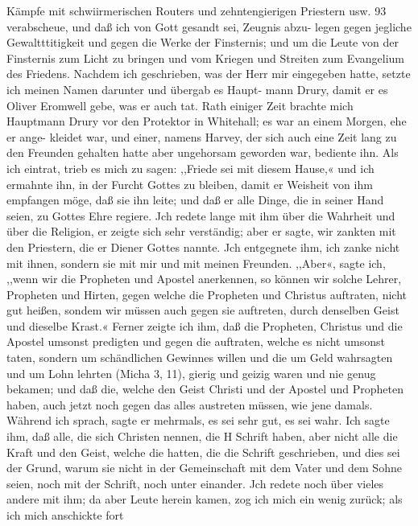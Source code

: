 Kämpfe mit schwiirmerischen Routers und zehntengierigen Priestern usw. 93
verabscheue, und daß ich von Gott gesandt sei, Zeugnis abzu-
legen gegen jegliche Gewaltttitigkeit und gegen die Werke der
Finsternis; und um die Leute von der Finsternis zum Licht zu
bringen und vom Kriegen und Streiten zum Evangelium des
Friedens. Nachdem ich geschrieben, was der Herr mir eingegeben
hatte, setzte ich meinen Namen darunter und übergab es Haupt-
mann Drury, damit er es Oliver Eromwell gebe, was er auch
tat. Rath einiger Zeit brachte mich Hauptmann Drury vor den
Protektor in Whitehall; es war an einem Morgen, ehe er ange-
kleidet war, und einer, namens Harvey, der sich auch eine Zeit
lang zu den Freunden gehalten hatte aber ungehorsam geworden
war, bediente ihn. Als ich eintrat, trieb es mich zu sagen:
,,Friede sei mit diesem Hause,« und ich ermahnte ihn, in der Furcht
Gottes zu bleiben, damit er Weisheit von ihm empfangen möge,
daß sie ihn leite; und daß er alle Dinge, die in seiner Hand
seien, zu Gottes Ehre regiere. Jch redete lange mit ihm über
die Wahrheit und über die Religion, er zeigte sich sehr verständig;
aber er sagte, wir zankten mit den Priestern, die er Diener Gottes
nannte. Jch entgegnete ihm, ich zanke nicht mit ihnen, sondern
sie mit mir und mit meinen Freunden. ,,Aber«, sagte ich, ,,wenn
wir die Propheten und Apostel anerkennen, so können wir solche
Lehrer, Propheten und Hirten, gegen welche die Propheten und
Christus auftraten, nicht gut heißen, sondem wir müssen auch
gegen sie auftreten, durch denselben Geist und dieselbe Krast.«
Ferner zeigte ich ihm, daß die Propheten, Christus und die
Apostel umsonst predigten und gegen die auftraten, welche es
nicht umsonst taten, sondern um schändlichen Gewinnes willen
und die um Geld wahrsagten und um Lohn lehrten (Micha 3, 11),
gierig und geizig waren und nie genug bekamen; und daß die,
welche den Geist Christi und der Apostel und Propheten haben,
auch jetzt noch gegen das alles austreten müssen, wie jene damals.
Während ich sprach, sagte er mehrmals, es sei sehr gut, es sei
wahr. Ich sagte ihm, daß alle, die sich Christen nennen, die
H Schrift haben, aber nicht alle die Kraft und den Geist, welche
die hatten, die die Schrift geschrieben, und dies sei der Grund,
warum sie nicht in der Gemeinschaft mit dem Vater und dem
Sohne seien, noch mit der Schrift, noch unter einander. Jch
redete noch über vieles andere mit ihm; da aber Leute herein
kamen, zog ich mich ein wenig zurück; als ich mich anschickte fort



